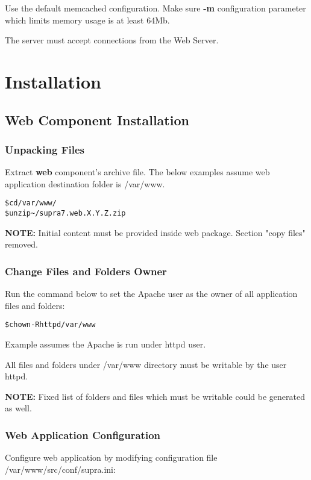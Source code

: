\documentclass[12pt]{article}
\newcommand{\vigShowNotes}{1}
\newcommand{\vigPackageName}{supra7}
\newcommand{\vigPathToProject}{/var/www}
\newcommand{\vigPathToSrc}{/src}
\newcommand{\vigReleasePath}{\textasciitilde/}
\newcommand{\vigReleaseVersion}{X.Y.Z}
\newcommand{\note}[1]{
\textbf{NOTE:} 
#1
}
\begin{document}
Use the default memcached configuration. Make sure \textbf{-m} configuration parameter which limits memory usage is at least 64Mb.

The server must accept connections from the Web Server.

\section{Installation}

\subsection{Web Component Installation}

\subsubsection{Unpacking Files}

Extract \textbf{web} component's archive file. The below examples assume web application destination folder is \textsf{{\vigPathToProject}}.

\begin{alltt}
\$ cd \vigPathToProject/
\$ unzip {\vigReleasePath}{\vigPackageName}.web.\vigReleaseVersion.zip
\end{alltt}

\note{Initial content must be provided inside web package. Section "copy files" removed.}

\subsubsection{Change Files and Folders Owner\label{fileOwnerSection}}

Run the command below to set the Apache user as the owner of all application files and folders:

\begin{alltt}
\$ chown -R httpd \vigPathToProject
\end{alltt}

Example assumes the Apache is run under \textsf{httpd} user.

All files and folders under \textsf{\vigPathToProject} directory must be writable by the user \textsf{httpd}.

\note{Fixed list of folders and files which must be writable could be generated as well.}

\subsubsection{Web Application Configuration}
Configure web application by modifying configuration file \textsf{\vigPathToProject\vigPathToSrc/conf/supra.ini}:
\end{document}
